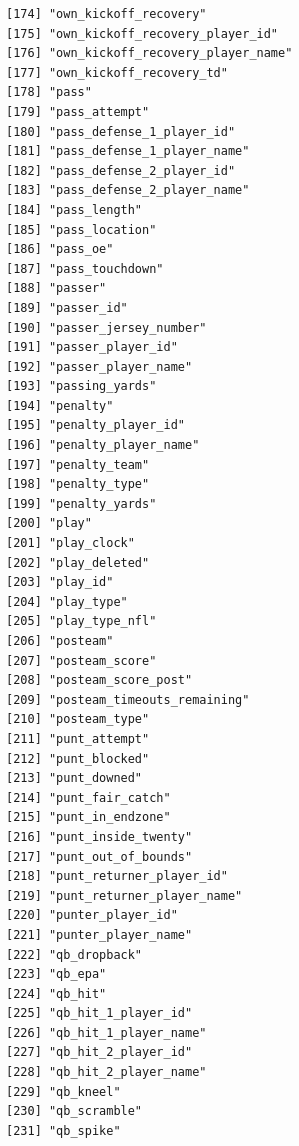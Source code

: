 \documentclass[
  letterpaper,
]{krantz}
\begin{document}
\begin{verbatim}
[174] "own_kickoff_recovery"                
[175] "own_kickoff_recovery_player_id"      
[176] "own_kickoff_recovery_player_name"    
[177] "own_kickoff_recovery_td"             
[178] "pass"                                
[179] "pass_attempt"                        
[180] "pass_defense_1_player_id"            
[181] "pass_defense_1_player_name"          
[182] "pass_defense_2_player_id"            
[183] "pass_defense_2_player_name"          
[184] "pass_length"                         
[185] "pass_location"                       
[186] "pass_oe"                             
[187] "pass_touchdown"                      
[188] "passer"                              
[189] "passer_id"                           
[190] "passer_jersey_number"                
[191] "passer_player_id"                    
[192] "passer_player_name"                  
[193] "passing_yards"                       
[194] "penalty"                             
[195] "penalty_player_id"                   
[196] "penalty_player_name"                 
[197] "penalty_team"                        
[198] "penalty_type"                        
[199] "penalty_yards"                       
[200] "play"                                
[201] "play_clock"                          
[202] "play_deleted"                        
[203] "play_id"                             
[204] "play_type"                           
[205] "play_type_nfl"                       
[206] "posteam"                             
[207] "posteam_score"                       
[208] "posteam_score_post"                  
[209] "posteam_timeouts_remaining"          
[210] "posteam_type"                        
[211] "punt_attempt"                        
[212] "punt_blocked"                        
[213] "punt_downed"                         
[214] "punt_fair_catch"                     
[215] "punt_in_endzone"                     
[216] "punt_inside_twenty"                  
[217] "punt_out_of_bounds"                  
[218] "punt_returner_player_id"             
[219] "punt_returner_player_name"           
[220] "punter_player_id"                    
[221] "punter_player_name"                  
[222] "qb_dropback"                         
[223] "qb_epa"                              
[224] "qb_hit"                              
[225] "qb_hit_1_player_id"                  
[226] "qb_hit_1_player_name"                
[227] "qb_hit_2_player_id"                  
[228] "qb_hit_2_player_name"                
[229] "qb_kneel"                            
[230] "qb_scramble"                         
[231] "qb_spike"                            

\end{verbatim}
\end{document}
